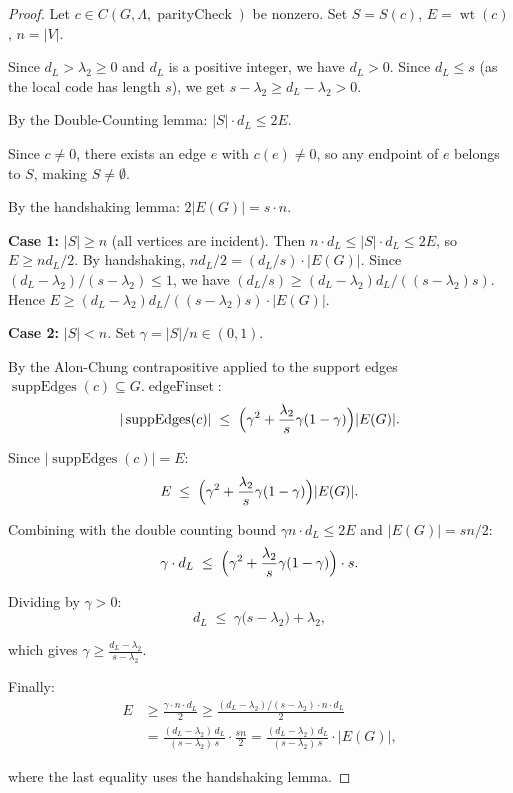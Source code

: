 \documentclass[11pt]{article}
\theoremstyle{plain}
\theoremstyle{definition}
\theoremstyle{remark}
\begin{document}
\begin{proof}
Let $c \in C(G, \Lambda, \operatorname{parityCheck})$ be nonzero. Set $S = S(c)$, $E = \operatorname{wt}(c)$, $n = |V|$.

Since $d_L > \lambda_2 \geq 0$ and $d_L$ is a positive integer, we have $d_L > 0$. Since $d_L \leq s$ (as the local code has length $s$), we get $s - \lambda_2 \geq d_L - \lambda_2 > 0$.

By the Double-Counting lemma: $|S| \cdot d_L \leq 2E$.

Since $c \neq 0$, there exists an edge $e$ with $c(e) \neq 0$, so any endpoint of $e$ belongs to $S$, making $S \neq \emptyset$.

By the handshaking lemma: $2|E(G)| = s \cdot n$.

\textbf{Case 1:} $|S| \geq n$ (all vertices are incident). Then $n \cdot d_L \leq |S| \cdot d_L \leq 2E$, so $E \geq n d_L/2$. By handshaking, $n d_L / 2 = (d_L/s) \cdot |E(G)|$. Since $(d_L - \lambda_2)/(s-\lambda_2) \leq 1$, we have $(d_L/s) \geq (d_L - \lambda_2)d_L/((s-\lambda_2)s)$. Hence $E \geq (d_L - \lambda_2)d_L/((s-\lambda_2)s) \cdot |E(G)|$.

\textbf{Case 2:} $|S| < n$. Set $\gamma = |S|/n \in (0,1)$.

By the Alon-Chung contrapositive applied to the support edges $\operatorname{suppEdges}(c) \subseteq G.\operatorname{edgeFinset}$:
\[
|\operatorname{suppEdges}(c)| \;\leq\; \Bigl(\gamma^2 + \frac{\lambda_2}{s}\gamma(1-\gamma)\Bigr)|E(G)|.
\]

Since $|\operatorname{suppEdges}(c)| = E$:
\[
E \;\leq\; \Bigl(\gamma^2 + \frac{\lambda_2}{s}\gamma(1-\gamma)\Bigr)|E(G)|.
\]

Combining with the double counting bound $\gamma n \cdot d_L \leq 2E$ and $|E(G)| = sn/2$:
\[
\gamma \cdot d_L \;\leq\; \Bigl(\gamma^2 + \frac{\lambda_2}{s}\gamma(1-\gamma)\Bigr)\cdot s.
\]

Dividing by $\gamma > 0$:
\[
d_L \;\leq\; \gamma\bigl(s - \lambda_2\bigr) + \lambda_2,
\]

which gives $\gamma \geq \frac{d_L - \lambda_2}{s - \lambda_2}$.

Finally:
\begin{align*}
E &\geq \frac{\gamma \cdot n \cdot d_L}{2} \geq \frac{(d_L-\lambda_2)/(s-\lambda_2) \cdot n \cdot d_L}{2} \\
&= \frac{(d_L-\lambda_2)\,d_L}{(s-\lambda_2)\,s} \cdot \frac{sn}{2} = \frac{(d_L-\lambda_2)\,d_L}{(s-\lambda_2)\,s} \cdot |E(G)|,
\end{align*}

where the last equality uses the handshaking lemma.
\end{proof}
\end{document}
